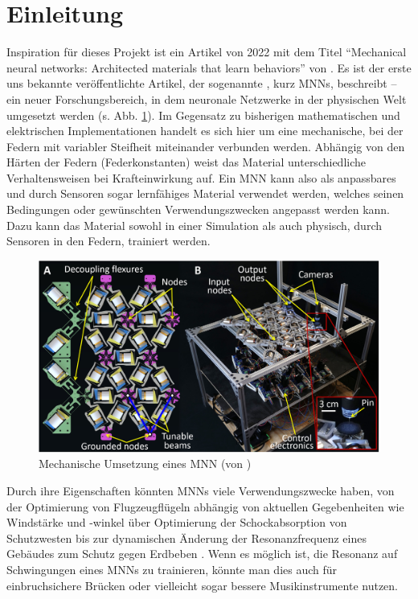 \section{Einleitung}

Inspiration für dieses Projekt ist ein Artikel von 2022 mit dem Titel \enquote{Mechanical neural networks: Architected materials that learn behaviors} von \lee{} \cite{Lee2022}.
%
Es ist der erste uns bekannte veröffentlichte Artikel, der sogenannte , kurz MNNs, beschreibt -- ein neuer Forschungsbereich, in dem neuronale Netzwerke in der physischen Welt umgesetzt werden (s. Abb. \ref{fig:mnn2-1}).
Im Gegensatz zu bisherigen mathematischen und elektrischen Implementationen handelt es sich hier um eine mechanische, bei der Federn mit variabler Steifheit miteinander verbunden werden.
Abhängig von den Härten der Federn (Federkonstanten) weist das Material unterschiedliche Verhaltensweisen bei Krafteinwirkung auf. 
%
Ein MNN kann also als anpassbares und durch Sensoren sogar lernfähiges Material verwendet werden, welches seinen Bedingungen oder gewünschten Verwendungszwecken angepasst werden kann.
Dazu kann das Material sowohl in einer Simulation als auch physisch, durch Sensoren in den Federn, trainiert werden.

\begin{figure}[H]
    \centering
    \includegraphics[width=0.7\linewidth]{bilder/mnn2-1.jpg}
    \caption{Mechanische Umsetzung eines MNN (von \cite{Lee2022})}
    \label{fig:mnn2-1}
\end{figure}

Durch ihre Eigenschaften könnten MNNs viele Verwendungszwecke haben, von der Optimierung von Flugzeugflügeln abhängig von aktuellen Gegebenheiten wie Windstärke und -winkel \cite[2]{Lee2022} über Optimierung der Schockabsorption von Schutzwesten bis zur dynamischen Änderung der Resonanzfrequenz eines Gebäudes zum Schutz gegen Erdbeben \cite[9]{Hopkins2023}.
Wenn es möglich ist, die Resonanz auf Schwingungen eines MNNs zu trainieren, könnte man dies auch für einbruchsichere Brücken oder vielleicht sogar bessere Musikinstrumente nutzen.

